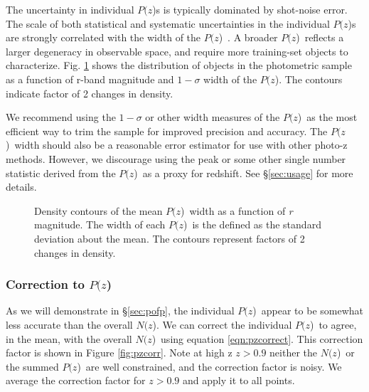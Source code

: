 \documentclass[preprint]{aastex}
\newcommand{\pofz}{$P(z$)}
\newcommand{\Nofz}{$N(z$)}
\begin{document}
The uncertainty in individual \pofz s is typically dominated by shot-noise
error.  The scale of both statistical and systematic uncertainties in the
individual \pofz s are strongly correlated with the width of the \pofz\
\citep{CunhaPhotoz09}.  A broader \pofz\ reflects a larger degeneracy in
observable space, and require more training-set objects to characterize.  Fig.
\ref{fig:pzwidth} shows the distribution of objects in the photometric sample
as a function of r-band magnitude and $1-\sigma$ width of the \pofz.  The
contours indicate factor of 2 changes in density.  

We recommend using the $1-\sigma$ or other width measures of the \pofz\ as the
most efficient way to trim the sample for improved precision and accuracy.  The
\pofz\ width should also be a reasonable error estimator for use with other
photo-z methods.  However, we discourage using the peak or some other single
number statistic derived from the \pofz\ as a proxy for redshift. See 
\S \ref{sec:usage} for more details.

\begin{figure}[p]\centering
    \caption{Density contours of the mean \pofz\ width as a function of {\it r} magnitude. 
The width of each \pofz\ is the defined as the standard deviation about the mean. 
The contours represent factors of 2 changes in density.}
    \label{fig:pzwidth}
    \vspace{2em}
\end{figure}

\subsubsection{Correction to \pofz} \label{sec:pzcorr}

As we will demonstrate in \S \ref{sec:pofp}, the individual \pofz\ appear to be
somewhat less accurate than the overall \Nofz.  We can correct the individual
\pofz\ to agree, in the mean, with the overall \Nofz\ using equation
\ref{eqn:pzcorrect}.  This correction factor is shown in Figure
\ref{fig:pzcorr}.  Note at high z $z > 0.9$ neither the \Nofz\ or the summed
\pofz\ are well constrained, and the correction factor is noisy.  We average
the correction factor for $z > 0.9$ and apply it to all points. 
\end{document}
